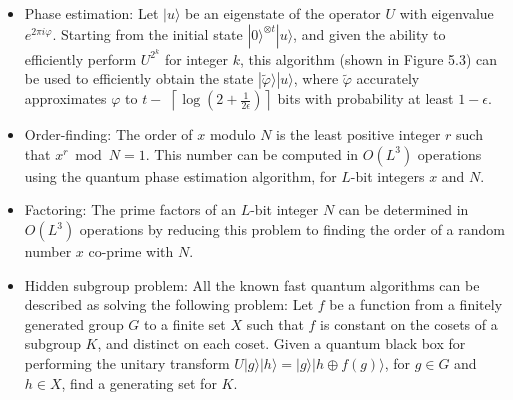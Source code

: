 \begin{itemize}
    \item Phase estimation: Let $|u\rangle$ be an eigenstate of the operator $U$ with eigenvalue $e^{2 \pi i \varphi}$. Starting from the initial state $|0\rangle^{\otimes t}|u\rangle$, and given the ability to efficiently perform $U^{2^{k}}$ for integer $k$, this algorithm (shown in Figure 5.3) can be used to efficiently obtain the state $|\tilde{\varphi}\rangle|u\rangle$, where $\tilde{\varphi}$ accurately approximates $\varphi$ to $t-$ $\left\lceil\log \left(2+\frac{1}{2 \epsilon}\right)\right\rceil$ bits with probability at least $1-\epsilon$.
    \item Order-finding: The order of $x$ modulo $N$ is the least positive integer $r$ such that $x^{r} \bmod N=1$. This number can be computed in $O\left(L^{3}\right)$ operations using the quantum phase estimation algorithm, for $L$-bit integers $x$ and $N$.
    \item Factoring: The prime factors of an $L$-bit integer $N$ can be determined in $O\left(L^{3}\right)$ operations by reducing this problem to finding the order of a random number $x$ co-prime with $N$.
    \item Hidden subgroup problem: All the known fast quantum algorithms can be described as solving the following problem: Let $f$ be a function from a finitely generated group $G$ to a finite set $X$ such that $f$ is constant on the cosets of a subgroup $K$, and distinct on each coset. Given a quantum black box for performing the unitary transform $U|g\rangle|h\rangle=|g\rangle|h \oplus f(g)\rangle$, for $g \in G$ and $h \in X$, find a generating set for $K$.
\end{itemize}

